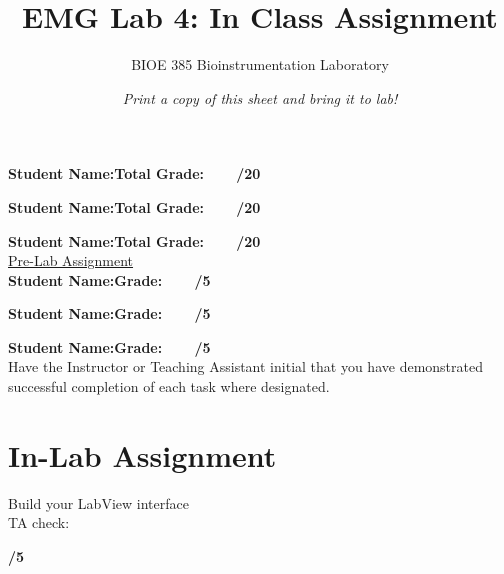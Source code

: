 \documentclass{article}
\title{EMG Lab 4: In Class Assignment}
\author{BIOE 385 Bioinstrumentation Laboratory}
\date{\textit{Print a copy of this sheet and bring it to lab!}}
\begin{document}
\large
\maketitle

\textbf{Student Name:}\hfill 	\textbf{Total Grade:\ \ \ \ /20}\vspace{0.5cm}

\textbf{Student Name:}\hfill 	\textbf{Total Grade:\ \ \ \ /20}\vspace{0.5cm}

\textbf{Student Name:}\hfill 	\textbf{Total Grade:\ \ \ \ /20}\\

\underline{Pre-Lab Assignment}\\

\textbf{Student Name:}\hfill 	\textbf{Grade:\ \ \ \ /5}\vspace{0.5cm}

\textbf{Student Name:}\hfill 	\textbf{Grade:\ \ \ \ /5}\vspace{0.5cm}

\textbf{Student Name:}\hfill 	\textbf{Grade:\ \ \ \ /5}\\

Have the Instructor or Teaching Assistant initial that you have demonstrated successful completion of each task where designated.

\section*{In-Lab Assignment}
Build your LabView interface
\\TA check: \underline{\hspace{2cm}}

\hfill \textbf{\underline{\hspace{1cm}}/5}
\end{document}
